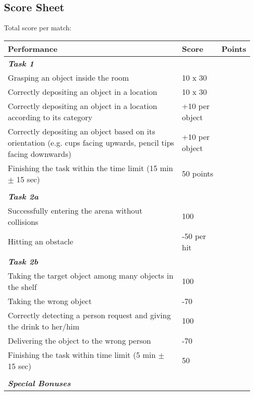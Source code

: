 \documentclass{article}
\begin{document}
\iffalse
\clearpage
\subsection{Score Sheet}

Total score per match:

\begin{center}
\begin{tabular}{ |m{8cm}|m{3cm}|m{1cm}| } 
    \hline
    \textbf{Performance} & \textbf{Score} & \textbf{Points} \\ 
    \hline
    \textbf{\textit{Task 1}} & & \\ 
    \hline
    Grasping an object inside the room & 10 x 30 & \\ 
    \hline
    Correctly depositing an object in a location & 10 x 30 & \\ 
    \hline
    Correctly depositing an object in a location according to its category & +10 per object & \\ 
    \hline
    Correctly depositing an object based on its orientation (e.g. cups facing upwards, pencil tips facing downwards) & +10 per object & \\
    \hline
    Finishing the task within the time limit (15 min $\pm$ 15 sec) & 50 points & \\ 
    \hline
    & & \\ 
    \hline
    \textbf{\textit{Task 2a}} & & \\ 
    \hline
    Successfully entering the arena without collisions & 100 & \\ 
    \hline
    Hitting an obstacle & -50 per hit & \\ 
    \hline
    \textbf{\textit{Task 2b}} & & \\ 
    \hline
    Taking the target object among many objects in the shelf & 100 & \\ 
    \hline
    Taking the wrong object & -70 & \\ 
    \hline
    Correctly detecting a person request and giving the drink to her/him & 100 & \\ 
    \hline
    Delivering the object to the wrong person & -70 & \\ 
    \hline
    Finishing the task within time limit (5 min $\pm$ 15 sec) & 50 & \\ 
    \hline
     & & \\ 
    \hline
    \textbf{\textit{Special Bonuses}} & & \\ 

\end{tabular}
\end{center}
\end{document}
